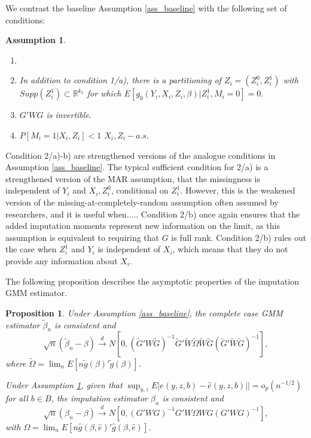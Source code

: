 \documentclass{article}
\newtheorem{assumption}{Assumption}
\newtheorem{proposition}{Proposition}
\theoremstyle{definition}
\theoremstyle{remark}
\begin{document}
We contrast the baseline Assumption \ref{ass_baseline} with the following set of conditions:
\begin{assumption}\label{ass_genericImputation}
	\begin{enumerate}
		\item[]
		\item[a)] In addition to condition 1/a), there is a partitioning of $Z_i=(Z_i^0, Z_i^1)$ with $Supp(Z_i^1) \subset \mathbb{R}^{k_1}$ for which $E[g_0(Y_i, X_i, Z_i, \beta)|Z^1_i, M_i=0] = 0.$
		\item[b)] $G'WG$ is invertible.
		\item[c)] $P[M_i=1|X_i,Z_i]<1$ $X_i,Z_i-a.s.$
	\end{enumerate}
\end{assumption}
Condition 2/a)-b) are strengthened versions of the analogue conditions in Assumption \ref{ass_baseline}. The typical sufficient condition for 2/a) is a strengthened version of the MAR assumption, that the missingness is independent of $Y_i$ and $X_i, Z_i^0$, conditional on $Z_i^1$. However, this is the weakened version of the missing-at-completely-random assumption often assumed by researchers, {\color{red} and it is useful when....}. Condition 2/b) once again ensures that the added imputation moments represent new information on the limit, as this assumption is equivalent to requiring that $G$ is full rank. Condition 2/b) rules out the case when $Z_i^1$ and $Y_i$ is independent of $X_i$, which means that they do not provide any information about $X_i$.

The following proposition describes the asymptotic properties of the imputation GMM estimator.
\begin{proposition}\label{prop_asympTheory}
	Under Assumption \ref{ass_baseline}, the complete case GMM estimator $\tilde{\beta}_n$ is consistent and
	\[\sqrt{n}(\tilde{\beta}_n-\beta) \stackrel{d}{\rightarrow} N[0, (\tilde{G}'W\tilde{G})^{-1}\tilde{G}'\tilde{W} \tilde{\Omega} \tilde{W} \tilde{G} (\tilde{G}'\tilde{W}\tilde{G})^{-1}],
	\]	
	where $\tilde{\Omega} = \lim_n E[n\tilde{g}(\beta)'\tilde{g}(\beta)].$
	
	Under Assumption \ref{ass_genericImputation}, given that $\sup_{y,z}E|e(y, z,b)-\hat{e}(y,z,b)||=o_p(n^{-1/2})$ for all $b \in B$, the imputation estimator $\beta_n$ is consistent and
	\[\sqrt{n}(\beta_n-\beta) \stackrel{d}{\rightarrow} N[0, (G'WG)^{-1}G'W \Omega W G (G'WG)^{-1}],
	\]
	with $\Omega= \lim_n E[n\hat{g}(\beta, \hat{e})'\hat{g}(\beta, \hat{e})]$.
\end{proposition}
\end{document}
